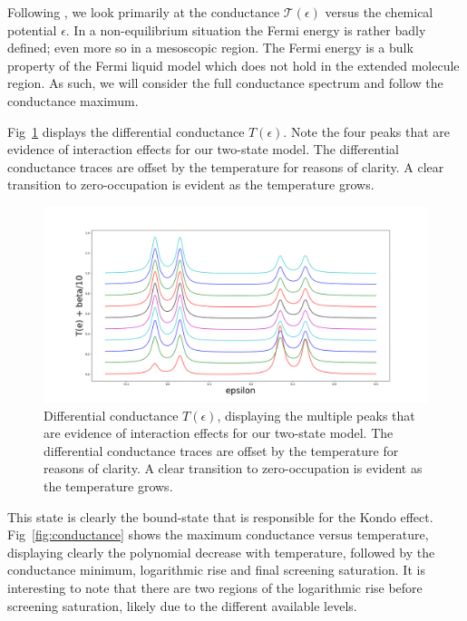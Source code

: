 \documentclass{article}
\begin{document}
\begin{multicols}{2}
        Following \citet{meir}, we look primarily at the conductance $\mathscr{T}(\epsilon)$ versus the chemical potential $\epsilon$. In a non-equilibrium situation the Fermi energy is rather badly defined; even more so in a mesoscopic region. The Fermi energy is a bulk property of the Fermi liquid model which does not hold in the extended molecule region. As such, we will consider the full conductance spectrum and follow the conductance maximum.
        
        Fig~\ref{fig:transplot} displays the differential conductance $T(\epsilon)$. Note the four peaks that are evidence of interaction effects for our two-state model. The differential conductance traces are offset by the temperature for reasons of clarity. A clear transition to zero-occupation is evident as the temperature grows.
        
        \begin{figure}[b]
            \centering
            \includegraphics[width=\textwidth]{fig/figure_3.png}
            \caption{\label{fig:transplot} Differential conductance $T(\epsilon)$, displaying the multiple peaks that are evidence of interaction effects for our two-state model. The differential conductance traces are offset by the temperature for reasons of clarity. A clear transition to zero-occupation is evident as the temperature grows.}
        \end{figure}
        
        This state is clearly the bound-state that is responsible for the Kondo effect. Fig~\ref{fig:conductance} shows the maximum conductance versus temperature, displaying clearly the polynomial decrease with temperature, followed by the conductance minimum, logarithmic rise and final screening saturation. It is interesting to note that there are two regions of the logarithmic rise before screening saturation, likely due to the different available levels.
        

\end{multicols}
\end{document}
